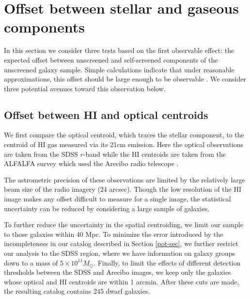 \documentclass[useAMS,usenatbib,twocolumn]{mn2e}
\begin{document}
\section{Offset between stellar and gaseous components}
\label{sec:offset}

In this section we consider three tests based on the first observable effect:
the expected offset between unscreened and self-screened components of the
unscreened galaxy sample. Simple calculations indicate that under
reasonable approximations, this offset should be large enough to be
observable \citep{bhuvjake2011}.  We consider three potential avenues toward
this observation below.

\subsection{Offset between HI and optical centroids}
\label{sec:h1-opt-offset}

We first  compare the optical centroid, which traces
the stellar component, to the centroid of HI gas measured via its 21cm emission. 
Here the optical observations are taken from the SDSS $r$-band \citep{aba09}
while the HI centroids
are taken from the ALFALFA survey which used the Arecibo radio telescope
\citep{giovanelli2005, gio07, sai08,ken08,mar09}.


The astrometric precision of these observations are limited by the
relatively large beam size of the radio imagery (24 arcsec).
Though the low resolution of the HI image makes any offset difficult to
measure for a single image,
the statistical uncertainty can be reduced by considering a large sample of
galaxies.

To further reduce the  uncertainty in the spatial centroiding,
we limit our sample to those galaxies within 40 Mpc.
To minimize the error introduced by the incompleteness in our catalog described
in Section \ref{pot-sec}, we further  restrict our analysis to the SDSS region,
where  we have information on galaxy groups down to a mass of
$5\times 10^{11}M_\odot$.  Finally, to limit the
effects of different detection thresholds between the SDSS and Arecibo
images, we keep only the galaxies whose optical and HI centroids are
within 1 arcmin.  After these cuts are made, the resulting catalog
contains 245 dwarf galaxies.
\end{document}
